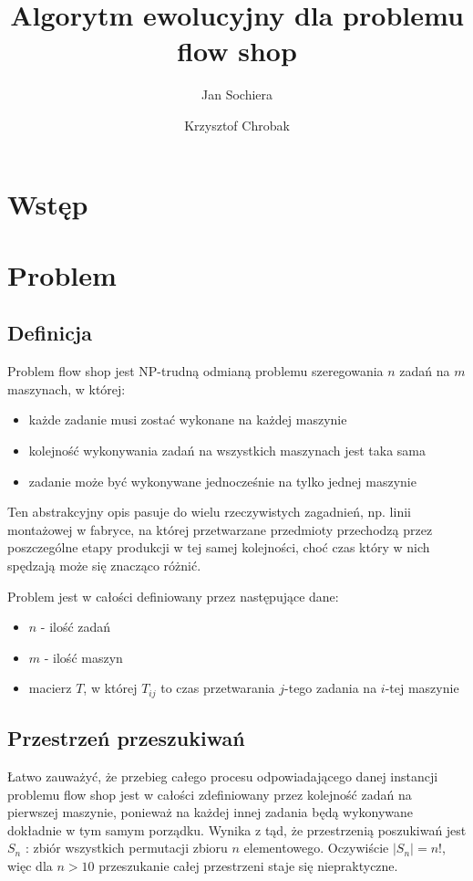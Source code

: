 \documentclass[11pt, a4wide]{article}
\title{Algorytm ewolucyjny dla problemu flow shop}
\author{Jan Sochiera \and Krzysztof Chrobak}
\begin{document}
\maketitle
\newpage

\section{Wstęp}


\section{Problem}
\subsection{Definicja}
Problem flow shop jest NP-trudną odmianą problemu szeregowania $n$ zadań na $m$ maszynach, w której:
\begin{itemize}
  \item każde zadanie musi zostać wykonane na każdej maszynie
  \item kolejność wykonywania zadań na wszystkich maszynach jest taka sama
  \item zadanie może być wykonywane jednocześnie na tylko jednej maszynie
\end{itemize}
Ten abstrakcyjny opis pasuje do wielu rzeczywistych zagadnień, np. linii montażowej w 
fabryce, na której przetwarzane przedmioty przechodzą przez poszczególne etapy produkcji w tej
samej kolejności, choć czas który w nich spędzają może się znacząco różnić.

Problem jest w całości definiowany przez następujące dane:
\begin{itemize}
  \item $n$ - ilość zadań
  \item $m$ - ilość maszyn 
  \item macierz $T$, w której $T_{ij}$ to czas przetwarania $j$-tego zadania na $i$-tej maszynie
\end{itemize}

\subsection{Przestrzeń przeszukiwań}
Łatwo zauważyć, że przebieg całego procesu odpowiadającego danej instancji problemu flow shop
jest w całości zdefiniowany przez kolejność zadań na pierwszej maszynie, ponieważ na każdej innej
zadania będą wykonywane dokładnie w tym samym porządku. Wynika z tąd, że przestrzenią poszukiwań jest
$S_n$ : zbiór wszystkich permutacji zbioru $n$ elementowego. Oczywiście $|S_n| = n!$, więc dla $n>10$
przeszukanie całej przestrzeni staje się niepraktyczne.
\end{document}
